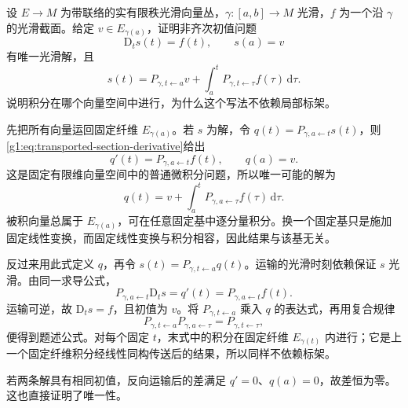 \begin{exercise}\label{g1:ex:transport-variation-of-constants}
	设 \(E\to M\) 为带联络的实有限秩光滑向量丛，\(\gamma:[a,b]\to M\) 光滑，\(f\) 为一个沿 \(\gamma\) 的光滑截面。给定 \(v\in E_{\gamma(a)}\)，证明非齐次初值问题
	\[
		\mathrm{D}_ts(t)=f(t),\qquad s(a)=v
	\]
	有唯一光滑解，且
	\[
		s(t)=P_{\gamma,t\leftarrow a}v+
		\int_a^t P_{\gamma,t\leftarrow\tau}f(\tau)\,\mathrm{d}\tau.
	\]
	说明积分在哪个向量空间中进行，为什么这个写法不依赖局部标架。
\end{exercise}
\begin{solution}
	先把所有向量运回固定纤维 \(E_{\gamma(a)}\)。若 \(s\) 为解，令 \(q(t)=P_{\gamma,a\leftarrow t}s(t)\)，则\eqref{g1:eq:transported-section-derivative}给出
	\[
		q'(t)=P_{\gamma,a\leftarrow t}f(t),\qquad q(a)=v.
	\]
	这是固定有限维向量空间中的普通微积分问题，所以唯一可能的解为
	\[
		q(t)=v+\int_a^tP_{\gamma,a\leftarrow\tau}f(\tau)\,\mathrm{d}\tau.
	\]
	被积向量总属于 \(E_{\gamma(a)}\)，可在任意固定基中逐分量积分。换一个固定基只是施加固定线性变换，而固定线性变换与积分相容，因此结果与该基无关。

	反过来用此式定义 \(q\)，再令 \(s(t)=P_{\gamma,t\leftarrow a}q(t)\)。运输的光滑时刻依赖保证 \(s\) 光滑。由同一求导公式，
	\[
		P_{\gamma,a\leftarrow t}\mathrm{D}_ts=q'(t)=P_{\gamma,a\leftarrow t}f(t).
	\]
	运输可逆，故 \(\mathrm{D}_ts=f\)，且初值为 \(v\)。将 \(P_{\gamma,t\leftarrow a}\) 乘入 \(q\) 的表达式，再用复合规律
	\[
		P_{\gamma,t\leftarrow a}P_{\gamma,a\leftarrow\tau}
		=P_{\gamma,t\leftarrow\tau},
	\]
	便得到题述公式。对每个固定 \(t\)，末式中的积分在固定纤维 \(E_{\gamma(t)}\) 内进行；它是上一个固定纤维积分经线性同构传送后的结果，所以同样不依赖标架。

	若两条解具有相同初值，反向运输后的差满足 \(q'=0\)、\(q(a)=0\)，故差恒为零。这也直接证明了唯一性。
\end{solution}

